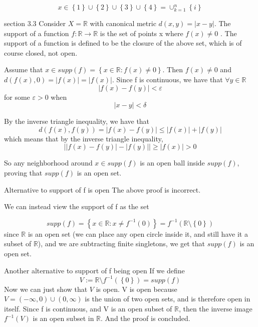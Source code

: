\documentclass[a4paper,norsk]{article}
\renewcommand{\geq}{\geqslant}
\renewcommand{\leq}{\leqslant}
\renewcommand{\epsilon}{\varepsilon}
\begin{document}
\[
    x \in  \left\{ 1 \right\} \cup \left\{ 2 \right\} \cup \left\{ 3 \right\} \cup \left\{ 4 \right\} = \cup_{k=1}^{n} \left\{ i \right\} 
\]

\begin{oppgavebox}{section 3.3}{}
Consider $ X = \mathbb{R} $ with canonical metric $ d(x,y) = \left| x -y \right|  $. The support of a function $ f : \mathbb{R} \rightarrow \mathbb{R} $ is the set of points x where $ f(x) \neq 0 $  . The support of a function is defined to be the closure of the above set, which is of course closed, not open.

\begin{proofbox}{}{}
  Assume that $ x \in supp(f) = \left\{ x \in \mathbb{R} : f(x) \neq 0 \right\}  $. Then $ f(x) \neq 0 $ and $ d(f(x), 0) = \left| f(x) \right| = \left| f(x) \right|  $. Since f is continuous, we have that $ \forall y \in \mathbb{R} $ 
  \[
      \left| f(x) - f(y) \right| < \epsilon 
  \]
  for some $ \epsilon > 0 $ when 
  \[
      \left| x - y \right| < \delta
  \]

  By the inverse triangle inequality, we have that
  \[
      d(f(x), f(y)) = \left| f(x) - f(y) \right|  \leq \left| f(x) \right| + \left| f(y) \right| 
  \]
  which means that by the inverse triangle inequality, 
  \[
      \left| \left| f(x) - f(y) \right| - \left| f(y) \right|   \right| \geq \left| f(x) \right| > 0
  \]
  
  So any neighborhood around $ x \in supp(f) $ is an open ball inside $ supp(f) $, proving that $ supp(f) $ is an open set.
  
\end{proofbox}

\begin{proofbox}{Alternative to support of f is open}{}
  The above proof is incorrect.

  We can instead view the support of f as the set 

  \[
      supp(f) = \left\{ x \in \mathbb{R} : x \neq f^{-1}(0) \right\} =   f^{-1} \left(  \mathbb{R} \setminus \left\{ 0 \right\}  \right) 
  \]
  since $ \mathbb{R} $ is an open set (we can place any open circle inside it, and still have it a subset of $ \mathbb{R} $), and we are subtracting finite singletons, we get that $ supp(f) $ is an open set.
  
\end{proofbox}

\begin{proofbox}{Another alternative to support of f being open}{}
  If we define
  \[
      V := \mathbb{R} \setminus f^{-1} \left(  \left\{ 0 \right\} \right)   = supp(f)
  \]
  Now we can just show that $ V $ is open. V is open because 
  $ V = \left( - \infty, 0 \right) \cup \left( 0, \infty \right)   $ is the union of two open sets, and is therefore open in itself. Since f is continuous, and V is an open subset of $ \mathbb{R} $, then the inverse image $ f^{-1} (V) $ is an open subset in $ \mathbb{R} $. And the proof is concluded. 
  
\end{proofbox}
\end{oppgavebox}
\end{document}
